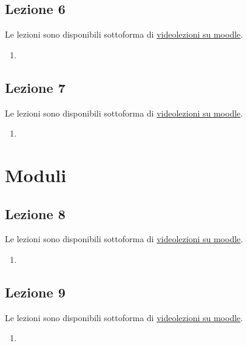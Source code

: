\documentclass[italian]{article}
\begin{document}
    \subsection{Lezione 6}

    Le lezioni sono disponibili sottoforma di 
    \href{https://didatticaonline.unitn.it/dol/course/view.php?id=23268}{videolezioni
    su moodle}.
    
    \begin{enumerate}
      \item 
    \end{enumerate}

    \subsection{Lezione 7}

    Le lezioni sono disponibili sottoforma di 
    \href{https://didatticaonline.unitn.it/dol/course/view.php?id=23268}{videolezioni
    su moodle}.
    
    \begin{enumerate}
      \item 
    \end{enumerate}
    
    \section{Moduli}
    
    \subsection{Lezione 8}

    Le lezioni sono disponibili sottoforma di 
    \href{https://didatticaonline.unitn.it/dol/course/view.php?id=23268}{videolezioni
    su moodle}.
    
    \begin{enumerate}
      \item 
    \end{enumerate}

    \subsection{Lezione 9}

    Le lezioni sono disponibili sottoforma di 
    \href{https://didatticaonline.unitn.it/dol/course/view.php?id=23268}{videolezioni
    su moodle}.
    
    \begin{enumerate}
      \item 
    \end{enumerate}
\end{document}
